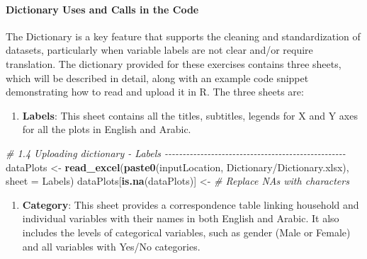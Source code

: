 \documentclass[
]{article}
\newenvironment{Shaded}{\begin{snugshade}}{\end{snugshade}}
\newcommand{\AttributeTok}[1]{\textcolor[rgb]{0.13,0.29,0.53}{#1}}
\newcommand{\CommentTok}[1]{\textcolor[rgb]{0.56,0.35,0.01}{\textit{#1}}}
\newcommand{\FunctionTok}[1]{\textcolor[rgb]{0.13,0.29,0.53}{\textbf{#1}}}
\newcommand{\NormalTok}[1]{#1}
\newcommand{\OtherTok}[1]{\textcolor[rgb]{0.56,0.35,0.01}{#1}}
\newcommand{\StringTok}[1]{\textcolor[rgb]{0.31,0.60,0.02}{#1}}
\providecommand{\tightlist}{%
  \setlength{\itemsep}{0pt}\setlength{\parskip}{0pt}}
\begin{document}
\paragraph{Dictionary Uses and Calls in the
Code}\label{dictionary-uses-and-calls-in-the-code}

The Dictionary is a key feature that supports the cleaning and
standardization of datasets, particularly when variable labels are not
clear and/or require translation. The dictionary provided for these
exercises contains three sheets, which will be described in detail,
along with an example code snippet demonstrating how to read and upload
it in R. The three sheets are:

\begin{enumerate}
\def\labelenumi{\arabic{enumi}.}
\tightlist
\item
  \textbf{Labels}: This sheet contains all the titles, subtitles,
  legends for X and Y axes for all the plots in English and Arabic.
\end{enumerate}

\begin{Shaded}
\begin{Highlighting}[]
\CommentTok{\# 1.4 Uploading dictionary {-} Labels  {-}{-}{-}{-}{-}{-}{-}{-}{-}{-}{-}{-}{-}{-}{-}{-}{-}{-}{-}{-}{-}{-}{-}{-}{-}{-}{-}{-}{-}{-}{-}{-}{-}{-}{-}{-}{-}{-}{-}{-}{-}{-}{-}{-}{-}{-}{-}{-}{-}{-}{-}}
\NormalTok{dataPlots }\OtherTok{\textless{}{-}} \FunctionTok{read\_excel}\NormalTok{(}\FunctionTok{paste0}\NormalTok{(inputLocation, }\StringTok{\textquotesingle{}Dictionary/Dictionary.xlsx\textquotesingle{}}\NormalTok{), }
                        \AttributeTok{sheet =} \StringTok{\textquotesingle{}Labels\textquotesingle{}}\NormalTok{)}
\NormalTok{dataPlots[}\FunctionTok{is.na}\NormalTok{(dataPlots)] }\OtherTok{\textless{}{-}} \StringTok{\textquotesingle{}\textquotesingle{}} \CommentTok{\# Replace NAs with characters}
\end{Highlighting}
\end{Shaded}

\begin{enumerate}
\def\labelenumi{\arabic{enumi}.}
\setcounter{enumi}{1}
\tightlist
\item
  \textbf{Category}: This sheet provides a correspondence table linking
  household and individual variables with their names in both English
  and Arabic. It also includes the levels of categorical variables, such
  as gender (Male or Female) and all variables with Yes/No categories.
\end{enumerate}
\end{document}
